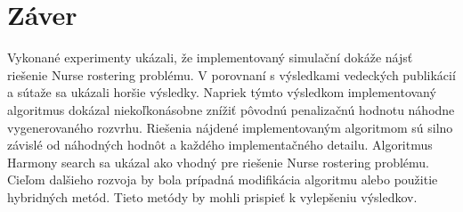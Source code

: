 \documentclass[a4paper, 14pt]{article}
\begin{document}
\section{Záver}
Vykonané experimenty ukázali, že implementovaný simulační dokáže nájsť riešenie Nurse rostering problému. V porovnaní s výsledkami vedeckých publikácií a sútaže sa ukázali horšie výsledky. Napriek týmto výsledkom implementovaný algoritmus dokázal niekoľkonásobne znížiť pôvodnú penalizačnú hodnotu náhodne vygenerovaného rozvrhu. Riešenia nájdené implementovaným algoritmom sú silno závislé od náhodných hodnôt a každého implementačného detailu. Algoritmus Harmony search sa ukázal ako vhodný pre riešenie Nurse rostering problému. Cieľom dalšieho rozvoja by bola prípadná modifikácia algoritmu alebo použitie hybridných metód. Tieto metódy by mohli prispieť k vylepšeniu výsledkov.   
\end{document}
